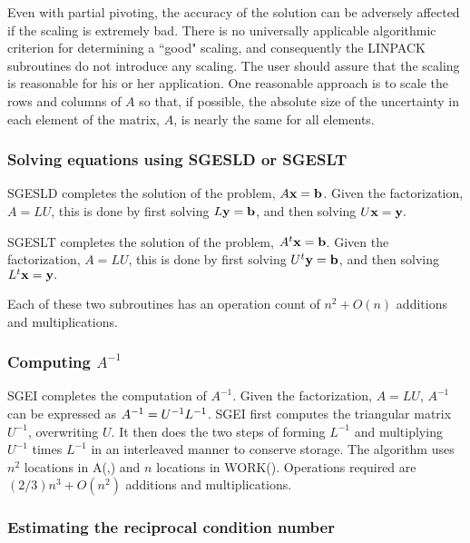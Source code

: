 \documentclass[twoside]{MATH77}
\begin{document}
Even with partial pivoting, the accuracy of the solution can be adversely
affected if the scaling is extremely bad. There is no universally applicable
algorithmic criterion for determining a ``good" scaling, and consequently
the LINPACK subroutines do not introduce any scaling. The user should assure
that the scaling is reasonable for his or her application. One reasonable
approach is to scale the rows and columns of $A$ so that, if possible, the
absolute size of the uncertainty in each element of the matrix, $A$, is nearly
the same for all elements.

\subsubsection{Solving equations using SGESLD or SGESLT}

SGESLD completes the solution of the problem, $A{\bf x} = {\bf b}$. Given the
factorization, $A = LU$, this is done by first solving $L{\bf y} = {\bf b}$, and then
solving $U{\bf x} = {\bf y}.$

SGESLT completes the solution of the problem, $A^t{\bf x} = {\bf b}$. Given the
factorization, $A = LU$, this is done by first solving $U^t{\bf y} = {\bf b}$, and then
solving $L^t{\bf x} = {\bf y}.$

Each of these two subroutines has an operation count of $n^2 + O(n)$
additions and multiplications.

\subsubsection{Computing $A^{-1}$}

SGEI completes the computation of $A^{-1}$. Given the
factorization, $A = LU$, $A^{-1}$ can be expressed as $A^{%
-1} = U^{-1}L^{-1}$. SGEI first
computes the triangular matrix $U^{-1}$, overwriting $U$. It
then does the two steps of forming $L^{-1}$ and multiplying $%
U^{-1}$ times $L^{-1}$ in an interleaved manner
to conserve storage. The algorithm uses $n^2$ locations in A(,) and $n$
locations in WORK(). Operations required are $(2/3)n^3 + O(n^2)$ additions
and multiplications.

\subsubsection{Estimating the reciprocal condition number}
\end{document}
